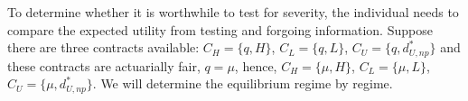 \documentclass[natbib=false,preprint,12pt]{elsarticle}
\theoremstyle{plain}
\newtheorem{prop}[theorem]{Proposition}
\theoremstyle{definition}
\theoremstyle{plain}
\theoremstyle{TheoremNum}
\theoremstyle{CorollaryNum}
\theoremstyle{PropositionNum}
\theoremstyle{TheoremNum}
\begin{document}


To determine whether it is worthwhile to test for severity, the individual needs to compare the expected utility from testing and forgoing information. Suppose there are three contracts available: $C_H = \{q, H\}$, $C_L = \{q, L\}$, $C_U = \{q, d_{U,np}^*\}$ and these contracts are actuarially fair, $q=\mu$, hence,  $C_H = \{\mu, H\}$, $C_L = \{\mu, L\}$, $C_U = \{\mu, d_{U,np}^*\}$. We will determine the equilibrium regime by regime.
\end{document}
